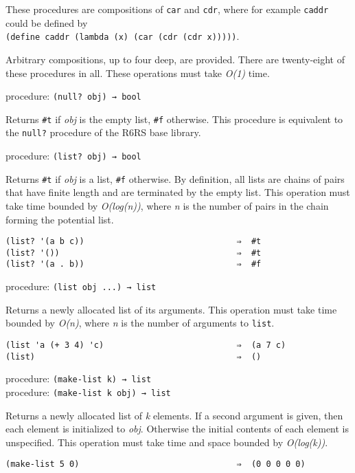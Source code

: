 These procedures are compositions of \texttt{car} and \texttt{cdr},
where for example \texttt{caddr} could be defined by\\
\texttt{(define\ caddr\ (lambda\ (x)\ (car\ (cdr\ (cdr\ x)))))}.

Arbitrary compositions, up to four deep, are provided. There are
twenty-eight of these procedures in all. These operations must take
\emph{O(1)} time.

procedure: \texttt{(null?\ obj)\ →\ bool}

Returns \texttt{\#t} if \emph{obj} is the empty list, \texttt{\#f}
otherwise. This procedure is equivalent to the \texttt{null?} procedure
of the R6RS base library.

procedure: \texttt{(list?\ obj)\ →\ bool}

Returns \texttt{\#t} if \emph{obj} is a list, \texttt{\#f} otherwise. By
definition, all lists are chains of pairs that have finite length and
are terminated by the empty list. This operation must take time bounded
by \emph{O(log(n))}, where \emph{n} is the number of pairs in the chain
forming the potential list.

\begin{verbatim}
(list? '(a b c))                               ⇒  #t
(list? '())                                    ⇒  #t
(list? '(a . b))                               ⇒  #f
\end{verbatim}

procedure: \texttt{(list\ obj\ ...)\ →\ list}

Returns a newly allocated list of its arguments. This operation must
take time bounded by \emph{O(n)}, where \emph{n} is the number of
arguments to \texttt{list}.

\begin{verbatim}
(list 'a (+ 3 4) 'c)                           ⇒  (a 7 c)
(list)                                         ⇒  ()
\end{verbatim}

procedure: \texttt{(make-list\ k)\ →\ list}\\
procedure: \texttt{(make-list\ k\ obj)\ →\ list}

Returns a newly allocated list of \emph{k} elements. If a second
argument is given, then each element is initialized to \emph{obj}.
Otherwise the initial contents of each element is unspecified. This
operation must take time and space bounded by \emph{O(log(k))}.

\begin{verbatim}
(make-list 5 0)                                ⇒  (0 0 0 0 0)
\end{verbatim}

